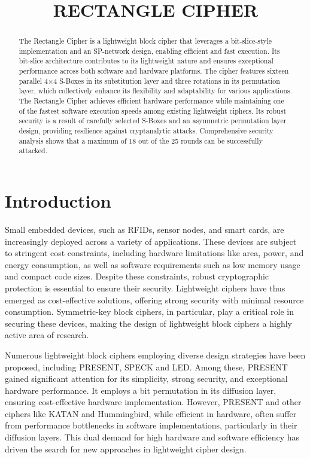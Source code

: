 \documentclass[journal=tosc,preprint]{iacrtrans}
\author{}
\institute{
  Kriti Gupta, 12140940, \email{kritig@iitbhilai.ac.in}
  \and
  Siddhi Agarwal, 12141570, \email{siddhiag@iitbhilai.ac.in}
}
\title{RECTANGLE CIPHER}
\begin{document}
\maketitle



\begin{abstract}
  The Rectangle Cipher is a lightweight block cipher that leverages a bit-slice-style implementation and an SP-network design, enabling efficient and fast execution. Its bit-slice architecture contributes to its lightweight nature and ensures exceptional performance across both software and hardware platforms. The cipher features sixteen parallel 4×4 S-Boxes in its substitution layer and three rotations in its permutation layer, which collectively enhance its flexibility and adaptability for various applications.\\
  The Rectangle Cipher achieves efficient hardware performance while maintaining one of the fastest software execution speeds among existing lightweight ciphers. Its robust security is a result of carefully selected S-Boxes and an asymmetric permutation layer design, providing resilience against cryptanalytic attacks. Comprehensive security analysis shows that a maximum of 18 out of the 25 rounds can be successfully attacked.
\end{abstract}


\section{Introduction}

Small embedded devices, such as RFIDs, sensor nodes, and smart cards, are increasingly deployed across a variety of applications. These devices are subject to stringent cost constraints, including hardware limitations like area, power, and energy consumption, as well as software requirements such as low memory usage and compact code sizes. Despite these constraints, robust cryptographic protection is essential to ensure their security. Lightweight ciphers have thus emerged as cost-effective solutions, offering strong security with minimal resource consumption. Symmetric-key block ciphers, in particular, play a critical role in securing these devices, making the design of lightweight block ciphers a highly active area of research.

Numerous lightweight block ciphers employing diverse design strategies have been proposed, including PRESENT, SPECK and LED. Among these, PRESENT gained significant attention for its simplicity, strong security, and exceptional hardware performance. It employs a bit permutation in its diffusion layer, ensuring cost-effective hardware implementation. However, PRESENT and other ciphers like KATAN and Hummingbird, while efficient in hardware, often suffer from performance bottlenecks in software implementations, particularly in their diffusion layers. This dual demand for high hardware and software efficiency has driven the search for new approaches in lightweight cipher design.
\end{document}
